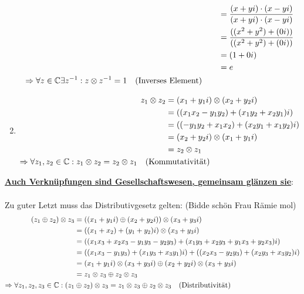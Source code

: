 \documentclass[../MAIN/main.tex]{subfiles}
\begin{document}
\begin{Beweis}
\begin{enumerate}[1)]
\begin{align*}
								  			  	   &= \dfrac{(x + yi) \cdot (x - yi)}{(x + yi) \cdot (x - yi)} \\
												   &= \dfrac{((x^2 + y^2) + (0i))}{((x^2 + y^2) + (0i))} \\
											  	   &= (1 + 0i) \\
											  	   &= e \\
						\Rightarrow \forall z \in \mathbb{C} \exists z^{-1}: z \otimes z^{-1} = 1 \quad \text{(Inverses Element)} \qquad &
	  			  \end{align*}
			\item \begin{align*}
						z_1 \otimes z_2 &= (x_1 + y_1i) \otimes (x_2 + y_2i) \\
									    &= ((x_1x_2 - y_1y_2) + (x_1y_2 + x_2y_1)i) \\
									    &= ((- y_1y_2 + x_1x_2) + (x_2y_1 + x_1y_2)i) \\
									    &= (x_2 + y_2i) \otimes (x_1 + y_1i) \\
									    &= z_2 \otimes z_1 \\
						\Rightarrow \forall z_1, z_2 \in \mathbb{C}: z_1 \otimes z_2 = z_2 \otimes z_1 \quad \text{(Kom}&\text{mutativität)}
				  \end{align*}
		\end{enumerate}
		\newpage
		\underline{\textbf{Auch Verknüpfungen sind Gesellschaftswesen, gemeinsam glänzen sie}}:
		\paragraph{} Zu guter Letzt muss das Distributivgesetz gelten: (Bidde schön Frau Rämie mol)
			\begin{align*}
				(z_1 \oplus z_2) \otimes z_3 &= ((x_1 + y_1i) \oplus (x_2 + y_2i)) \otimes (x_3 + y_3i) \\
											 &= ((x_1 + x_2) +  (y_1 + y_2)i) \otimes (x_3 + y_3i) \\
											 &= ((x_1x_3 + x_2x_3 - y_1y_3 - y_2y_3) + (x_1y_3 + x_2y_3 + y_1x_3 + y_2x_3)i) \\
											 &= ((x_1x_3 - y_1y_3) + (x_1y_3 + x_3y_1)i) + ((x_2x_3 - y_2y_3) + (x_2y_3 + x_3y_2)i) \\
											 &= (x_1 + y_1i) \otimes (x_3 + y_3i) \oplus (x_2 + y_2i) \otimes (x_3 + y_3i) \\
											 &= z_1 \otimes z_3 \oplus z_2 \otimes z_3 \\
			\Rightarrow \forall z_1, z_2, z_3 \in \mathbb{C}: (z_1 &\oplus z_2) \otimes z_3 = z_1 \otimes z_3 \oplus z_2 \otimes z_3 \quad \text{(Distributivität)}
			\end{align*}
	\end{Beweis}
\end{document}
